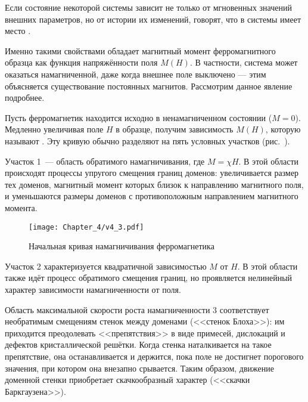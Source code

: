 \label{sec:histeresis}

Если состояние некоторой системы зависит не только от мгновенных значений
внешних параметров, но от истории их изменений, говорят, что
в системы имеет место .

Именно такими свойствами обладает магнитный момент ферромагнитного образца
как функция напряжённости поля $M(H)$. В частности,
система может оказаться намагниченной, даже когда внешнее поле выключено ---
этим объясняется существование постоянных магнитов. Рассмотрим данное явление подробнее.

Пусть ферромагнетик находится исходно в ненамагниченном состоянии
($M = 0$). Медленно увеличивая поле $H$ в образце, получим зависимость
$M(H)$, которую называют . Эту кривую обычно
разделяют на пять условных участков (рис.~).

Участок 1~--- область обратимого намагничивания, где $M =\chi H$. В этой области
происходят процессы упругого смещения границ доменов: увеличивается размер тех
доменов, магнитный момент которых близок к направлению магнитного поля, и
уменьшаются размеры доменов с противоположным направлением магнитного момента.

\begin{wrapfigure}[]{r}{0.5\textwidth}
\centering\texttt{[image: Chapter\_4/v4\_3.pdf]}
    \caption{Начальная кривая намагничивания ферромагнетика}
\end{wrapfigure}

Участок 2 характеризуется квадратичной зависимостью $M$ от $H$. В этой области
также идёт процесс обратимого смещения границ, но проявляется нелинейный характер
зависимости намагниченности от поля.

Область максимальной скорости роста намагниченности 3 соответствует необратимым
смещениям стенок между доменами (<<стенок Блоха>>):
им приходится преодолевать <<препятствия>> в виде примесей,
дислокаций и дефектов кристаллической решётки.
Когда стенка наталкивается на такое препятствие, она останавливается и держится,
пока поле не достигнет порогового значения, при котором она внезапно
срывается. Таким образом, движение доменной стенки приобретает скачкообразный
характер (<<скачки Баркгаузена>>).

